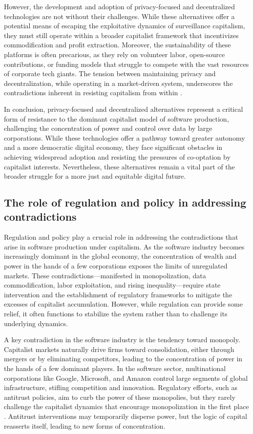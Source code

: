 However, the development and adoption of privacy-focused and decentralized technologies are not without their challenges. While these alternatives offer a potential means of escaping the exploitative dynamics of surveillance capitalism, they must still operate within a broader capitalist framework that incentivizes commodification and profit extraction. Moreover, the sustainability of these platforms is often precarious, as they rely on volunteer labor, open-source contributions, or funding models that struggle to compete with the vast resources of corporate tech giants. The tension between maintaining privacy and decentralization, while operating in a market-driven system, underscores the contradictions inherent in resisting capitalism from within \cite[pp.~87-89]{morozov2013}.

In conclusion, privacy-focused and decentralized alternatives represent a critical form of resistance to the dominant capitalist model of software production, challenging the concentration of power and control over data by large corporations. While these technologies offer a pathway toward greater autonomy and a more democratic digital economy, they face significant obstacles in achieving widespread adoption and resisting the pressures of co-optation by capitalist interests. Nevertheless, these alternatives remain a vital part of the broader struggle for a more just and equitable digital future.

\subsection{The role of regulation and policy in addressing contradictions}

Regulation and policy play a crucial role in addressing the contradictions that arise in software production under capitalism. As the software industry becomes increasingly dominant in the global economy, the concentration of wealth and power in the hands of a few corporations exposes the limits of unregulated markets. These contradictions—manifested in monopolization, data commodification, labor exploitation, and rising inequality—require state intervention and the establishment of regulatory frameworks to mitigate the excesses of capitalist accumulation. However, while regulation can provide some relief, it often functions to stabilize the system rather than to challenge its underlying dynamics.

A key contradiction in the software industry is the tendency toward monopoly. Capitalist markets naturally drive firms toward consolidation, either through mergers or by eliminating competitors, leading to the concentration of power in the hands of a few dominant players. In the software sector, multinational corporations like Google, Microsoft, and Amazon control large segments of global infrastructure, stifling competition and innovation. Regulatory efforts, such as antitrust policies, aim to curb the power of these monopolies, but they rarely challenge the capitalist dynamics that encourage monopolization in the first place \cite[pp.~83-85]{fuchs2015}. Antitrust interventions may temporarily disperse power, but the logic of capital reasserts itself, leading to new forms of concentration.

